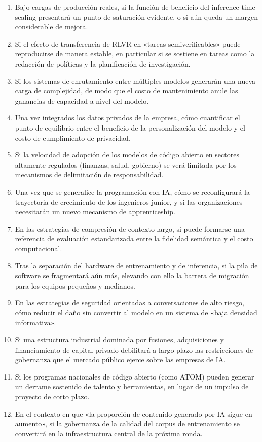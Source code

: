 \documentclass[a4paper]{article}
\begin{document}
\begin{enumerate}[leftmargin=1.8em]
    \item Bajo cargas de producción reales, si la función de beneficio del inference-time scaling presentará un punto de saturación evidente, o si aún queda un margen considerable de mejora.
    \item Si el efecto de transferencia de RLVR en «tareas semiverificables» puede reproducirse de manera estable, en particular si se sostiene en tareas como la redacción de políticas y la planificación de investigación.
    \item Si los sistemas de enrutamiento entre múltiples modelos generarán una nueva carga de complejidad, de modo que el costo de mantenimiento anule las ganancias de capacidad a nivel del modelo.
    \item Una vez integrados los datos privados de la empresa, cómo cuantificar el punto de equilibrio entre el beneficio de la personalización del modelo y el costo de cumplimiento de privacidad.
    \item Si la velocidad de adopción de los modelos de código abierto en sectores altamente regulados (finanzas, salud, gobierno) se verá limitada por los mecanismos de delimitación de responsabilidad.
    \item Una vez que se generalice la programación con IA, cómo se reconfigurará la trayectoria de crecimiento de los ingenieros junior, y si las organizaciones necesitarán un nuevo mecanismo de apprenticeship.
    \item En las estrategias de compresión de contexto largo, si puede formarse una referencia de evaluación estandarizada entre la fidelidad semántica y el costo computacional.
    \item Tras la separación del hardware de entrenamiento y de inferencia, si la pila de software se fragmentará aún más, elevando con ello la barrera de migración para los equipos pequeños y medianos.
    \item En las estrategias de seguridad orientadas a conversaciones de alto riesgo, cómo reducir el daño sin convertir al modelo en un sistema de «baja densidad informativa».
    \item Si una estructura industrial dominada por fusiones, adquisiciones y financiamiento de capital privado debilitará a largo plazo las restricciones de gobernanza que el mercado público ejerce sobre las empresas de IA.
    \item Si los programas nacionales de código abierto (como ATOM) pueden generar un derrame sostenido de talento y herramientas, en lugar de un impulso de proyecto de corto plazo.
    \item En el contexto en que «la proporción de contenido generado por IA sigue en aumento», si la gobernanza de la calidad del corpus de entrenamiento se convertirá en la infraestructura central de la próxima ronda.
\end{enumerate}
\end{document}
